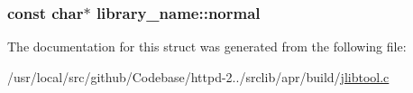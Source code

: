 \subsubsection[{\texorpdfstring{normal}{normal}}]{\setlength{\rightskip}{0pt plus 5cm}const char$\ast$ library\+\_\+name\+::normal}\hypertarget{structlibrary__name_adcb558772c92c93af0ec6ab6535c73d9}{}\label{structlibrary__name_adcb558772c92c93af0ec6ab6535c73d9}


The documentation for this struct was generated from the following file\+:\begin{DoxyCompactItemize}
\item 
/usr/local/src/github/\+Codebase/httpd-\/2../srclib/apr/build/\hyperlink{jlibtool_8c}{jlibtool.\+c}\end{DoxyCompactItemize}
